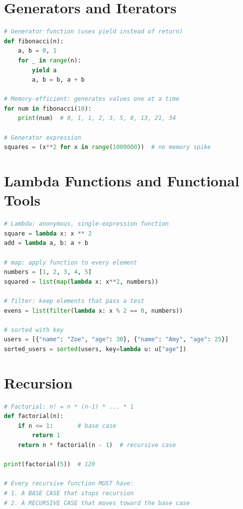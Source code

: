 \documentclass[12pt, a4paper, oneside]{book}
\begin{document}
\section{Generators and Iterators}

\begin{lstlisting}[language=Python, caption={Generators}]
# Generator function (uses yield instead of return)
def fibonacci(n):
    a, b = 0, 1
    for _ in range(n):
        yield a
        a, b = b, a + b

# Memory-efficient: generates values one at a time
for num in fibonacci(10):
    print(num)  # 0, 1, 1, 2, 3, 5, 8, 13, 21, 34

# Generator expression
squares = (x**2 for x in range(1000000))  # no memory spike
\end{lstlisting}

\section{Lambda Functions and Functional Tools}

\begin{lstlisting}[language=Python, caption={Lambda and functional programming}]
# Lambda: anonymous, single-expression function
square = lambda x: x ** 2
add = lambda a, b: a + b

# map: apply function to every element
numbers = [1, 2, 3, 4, 5]
squared = list(map(lambda x: x**2, numbers))

# filter: keep elements that pass a test
evens = list(filter(lambda x: x % 2 == 0, numbers))

# sorted with key
users = [{"name": "Zoe", "age": 30}, {"name": "Amy", "age": 25}]
sorted_users = sorted(users, key=lambda u: u["age"])
\end{lstlisting}

\section{Recursion}

\begin{lstlisting}[language=Python, caption={Recursion}]
# Factorial: n! = n * (n-1) * ... * 1
def factorial(n):
    if n <= 1:       # base case
        return 1
    return n * factorial(n - 1)  # recursive case

print(factorial(5))  # 120

# Every recursive function MUST have:
# 1. A BASE CASE that stops recursion
# 2. A RECURSIVE CASE that moves toward the base case
\end{lstlisting}
\end{document}

